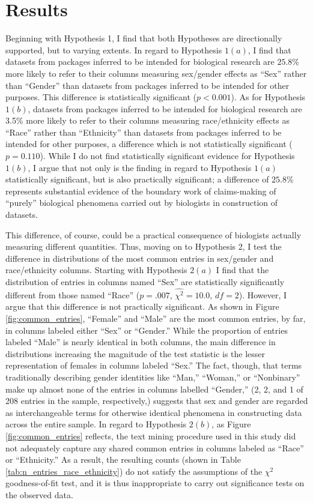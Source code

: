 \section{Results}\label{sec:results}

\hspace{13pt} Beginning with Hypothesis 1, I find that both Hypotheses are directionally supported, but to varying extents. In regard to Hypothesis $1(a)$, I find that datasets from packages inferred to be intended for biological research are $25.8\%$ more likely to refer to their columns measuring sex/gender effects as ``Sex'' rather than ``Gender'' than datasets from packages inferred to be intended for other purposes. This difference is statistically significant ($p < 0.001$). As for Hypothesis $1(b)$, datasets from packages inferred to be intended for biological research are 3.5\% more likely to refer to their columns measuring race/ethnicity effects as ``Race'' rather than ``Ethnicity'' than datasets from packages inferred to be intended for other purposes, a difference which is not statistically significant ($p = 0.110$). While I do not find statistically significant evidence for Hypothesis $1(b)$, I argue that not only is the finding in regard to Hypothesis $1(a)$ statistically significant, but is also practically significant; a difference of $25.8\%$ represents substantial evidence of the boundary work of claims-making of ``purely'' biological phenomena carried out by biologists in construction of datasets.

This difference, of course, could be a practical consequence of biologists actually measuring different quantities. Thus, moving on to Hypothesis 2, I test the difference in distributions of the most common entries in sex/gender and race/ethnicity columns. Starting with Hypothesis $2(a)$ I find that the distribution of entries in columns named ``Sex'' are statistically significantly different from those named ``Race'' ($p = .007$, $\hat{\chi^2} = 10.0$, $df = 2$). However, I argue that this difference is not practically significant. As shown in Figure \ref{fig:common_entries}, ``Female'' and ``Male'' are the most common entries, by far, in columns labeled either ``Sex'' or ``Gender.'' While the proportion of entries labeled ``Male'' is nearly identical in both columns, the main difference in distributions increasing the magnitude of the test statistic is the lesser representation of females in columns labeled ``Sex.'' The fact, though, that terms traditionally describing gender identities like ``Man,'' ``Woman,'' or ``Nonbinary''  make up almost none of the entries in columns labelled ``Gender,'' (2, 2, and 1 of 208 entries in the sample, respectively,) suggests that sex and gender are regarded as interchangeable terms for otherwise identical phenomena in constructing data across the entire sample. In regard to Hypothesis $2(b)$, as Figure \ref{fig:common_entries} reflects,  the text mining procedure used in this study did not adequately capture any shared common entries in columns labeled as ``Race'' or ``Ethnicity.'' As a result, the resulting counts (shown in Table \ref{tab:n_entries_race_ethnicity}) do not satisfy the assumptions of the $\chi^2$ goodness-of-fit test, and it is thus inappropriate to carry out significance tests on the observed data.

